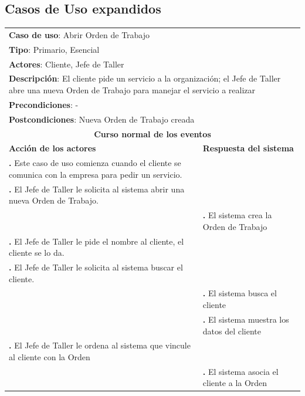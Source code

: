 \documentclass[12pt]{extarticle}
\begin{document}
\begin{spacing}{1.2}
        \subsection{Casos de Uso expandidos}

        \newcommand\inc{\stepcounter{step}\textbf{\thestep. }}



        \begin{longtable}{ |p{8cm}|p{8cm}| }
            \hline
            \multicolumn{2}{|p{16cm}|}{\textbf{Caso de uso}: Abrir Orden de Trabajo}\\
            \multicolumn{2}{|p{16cm}|}{\textbf{Tipo}: Primario, Esencial}\\
            \multicolumn{2}{|p{16cm}|}{\textbf{Actores}: Cliente, Jefe de Taller}\\
            \multicolumn{2}{|p{16cm}|}{\textbf{Descripción}: El cliente pide un servicio a la organización; el Jefe de Taller abre una nueva Orden de Trabajo para manejar el servicio a realizar}\\
            \multicolumn{2}{|p{16cm}|}{\textbf{Precondiciones}: -}\\
            \multicolumn{2}{|p{16cm}|}{\textbf{Postcondiciones}: Nueva Orden de Trabajo creada}\\
            \hline
            \multicolumn{2}{|c|}{\textbf{Curso normal de los eventos}}\\
            \hline
            \textbf{Acción de los actores} & \textbf{Respuesta del sistema}\\
            \hline
                \inc Este caso de uso comienza cuando el cliente se comunica con la empresa para pedir un servicio. & \\
                \hline

                \inc El Jefe de Taller le solicita al sistema abrir una nueva Orden de Trabajo. &  \\
                \hline
                & \inc El sistema crea la Orden de Trabajo  \\

                \hline
                \inc El Jefe de Taller le pide el nombre al cliente, el cliente se lo da. &  \\
                \hline
                \inc El Jefe de Taller le solicita al sistema buscar el cliente. &  \\
                \hline
                & \inc El sistema busca el cliente\\
                \hline
                & \inc El sistema muestra los datos del cliente\\
                \hline
                \inc El Jefe de Taller le ordena al sistema que vincule al cliente con la Orden& \\
                \hline
                & \inc El sistema asocia el cliente a la Orden\\


\end{longtable}
\end{spacing}
\end{document}
